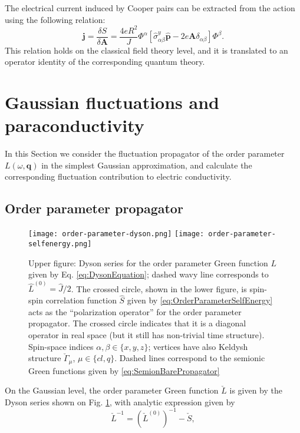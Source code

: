 \documentclass[twocolumn,english,prb]{revtex4-1}
\begin{document}
The electrical current induced by Cooper pairs can be extracted from the action using the following relation:
\begin{equation}
\label{eq:ElectricCurrent}
\boldsymbol{j}=\frac{\delta S}{\delta\boldsymbol{A}}=\frac{4 e R^2}{J}\Phi^{\alpha}\left[\hat{\sigma}^{y}_{\alpha \beta}\hat{\boldsymbol{p}}-2e\boldsymbol{A}\delta_{\alpha \beta}\right]\Phi^{\beta}.
\end{equation}
This relation holds on the classical field theory level, and it is translated to an operator identity of the corresponding quantum  theory.


\section{Gaussian fluctuations and paraconductivity}
\label{sec:Gaussian}

In this Section we consider the fluctuation propagator  of the order parameter  $L(\omega, \boldsymbol{q})$
in the simplest Gaussian approximation, and calculate the corresponding fluctuation contribution to  
electric conductivity.

\subsection{Order parameter propagator}
\label{sec:OrderParameterMeanField}

\begin{figure}
	\centering
	\texttt{[image: order-parameter-dyson.png]}
	\texttt{[image: order-parameter-selfenergy.png]}
	\caption{Upper figure: Dyson series for the order parameter Green function $L$ given by Eq. \eqref{eq:DysonEquation}; dashed wavy line corresponds to $\hat{L}^{(0)} = \hat{J}/2$. The crossed circle, shown in the lower figure, is spin-spin correlation function $\hat{S}$ given by \eqref{eq:OrderParameterSelfEnergy} acts as the ``polarization operator'' for the order parameter propagator. The crossed circle indicates that it is a diagonal operator in real space (but it still has non-trivial time structure). Spin-space indices $\alpha,\beta \in \{x,y,z\}$; vertices have also Keldysh structure $\check{\Gamma}_\mu$, $\mu \in \{cl, q\}$. Dashed lines correspond to the semionic Green functions given by \eqref{eq:SemionBarePropagator}}
	\label{fig:OrderParameterSelfEnergy}
\end{figure}

On the Gaussian level, the order parameter Green function $\check{L}$ is given by the Dyson series shown on Fig. \ref{fig:OrderParameterSelfEnergy}, with analytic expression given by
\begin{equation}
\label{eq:DysonEquation}
\check{L}^{-1}=(\check{L}^{(0)})^{-1}-\check{S},
\end{equation}
\end{document}
